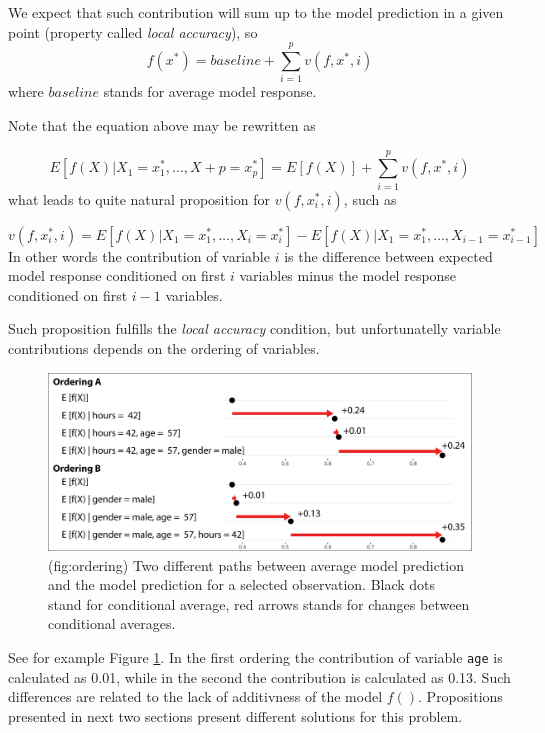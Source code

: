 \documentclass[]{krantz}
\theoremstyle{definition}
\theoremstyle{definition}
\theoremstyle{definition}
\theoremstyle{remark}
\begin{document}
We expect that such contribution will sum up to the model prediction in
a given point (property called \emph{local accuracy}), so \[
f(x^*) = baseline + \sum_{i=1}^p v(f, x^*, i)
\] where \(baseline\) stands for average model response.

Note that the equation above may be rewritten as

\[
E [f(X)|X_1 = x_1^*, \ldots, X+p = x_p^*] = E[f(X)] + \sum_{i=1}^p v(f, x^*, i)
\] what leads to quite natural proposition for \(v(f, x^*_i, i)\), such
as

\[
v(f, x^*_i, i) = E [f(X) | X_1 = x_1^*, \ldots, X_i = x_i^*] - E [f(X) | X_1 = x_1^*, \ldots, X_{i-1} = x_{i-1}^*] 
\] In other words the contribution of variable \(i\) is the difference
between expected model response conditioned on first \(i\) variables
minus the model response conditioned on first \(i-1\) variables.

Such proposition fulfills the \emph{local accuracy} condition, but
unfortunatelly variable contributions depends on the ordering of
variables.

\begin{figure}

{\centering \includegraphics[width=1\linewidth]{figure/ordering} 

}

\caption{(fig:ordering) Two different paths between average model prediction and the model prediction for a selected observation. Black dots stand for conditional average, red arrows stands for changes between conditional averages.}\label{fig:ordering}
\end{figure}

See for example Figure \ref{fig:ordering}. In the first ordering the
contribution of variable \texttt{age} is calculated as 0.01, while in
the second the contribution is calculated as 0.13. Such differences are
related to the lack of additivness of the model \(f()\). Propositions
presented in next two sections present different solutions for this
problem.
\end{document}
